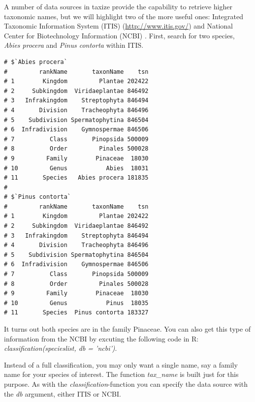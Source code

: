 \begin{sloppypar}
A number of data sources in taxize provide the capability to retrieve higher taxonomic names, but we will highlight two of the more useful ones: Integrated Taxonomic Information System (ITIS) (\url{http://www.itis.gov/}) and National Center for Biotechnology Information (NCBI) \citep{federhen2012}.
First, search for two species, \emph{Abies procera} and \emph{Pinus contorta} within ITIS.

\begin{knitrout}
\small

\color{fgcolor}
\begin{kframe}
\begin{alltt}
 \hlkwb{<-} \hlstd{(}\hlstd{,} \hlstd{)}
  \hlstd{=} \hlstd{)}
\end{alltt}
\begin{verbatim}
# $`Abies procera`
#         rankName       taxonName    tsn
# 1        Kingdom         Plantae 202422
# 2     Subkingdom  Viridaeplantae 846492
# 3   Infrakingdom    Streptophyta 846494
# 4       Division    Tracheophyta 846496
# 5    Subdivision Spermatophytina 846504
# 6  Infradivision    Gymnospermae 846506
# 7          Class       Pinopsida 500009
# 8          Order         Pinales 500028
# 9         Family        Pinaceae  18030
# 10         Genus           Abies  18031
# 11       Species   Abies procera 181835
# 
# $`Pinus contorta`
#         rankName       taxonName    tsn
# 1        Kingdom         Plantae 202422
# 2     Subkingdom  Viridaeplantae 846492
# 3   Infrakingdom    Streptophyta 846494
# 4       Division    Tracheophyta 846496
# 5    Subdivision Spermatophytina 846504
# 6  Infradivision    Gymnospermae 846506
# 7          Class       Pinopsida 500009
# 8          Order         Pinales 500028
# 9         Family        Pinaceae  18030
# 10         Genus           Pinus  18035
# 11       Species  Pinus contorta 183327
\end{verbatim}
\end{kframe}
\end{knitrout}

It turns out both species are in the family Pinaceae.
You can also get this type of information from the NCBI by excuting the following code in R: \emph{classification(specieslist, db = 'ncbi')}.

Instead of a full classification, you may only want a single name, say a family name for your species of interest.
The function \emph{tax\_name} is built just for this purpose.
As with the \emph{classification}-function you can specify the data source with the \emph{db} argument, either ITIS or NCBI. 


\end{sloppypar}
